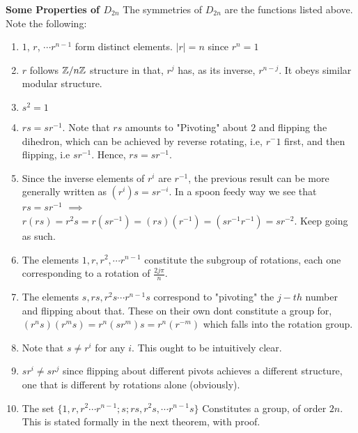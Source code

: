 \documentclass[../Main.tex]{subfiles}
\begin{document}

\textbf{Some Properties of $D_{2n}$}
The symmetries of $D_{2n}$ are the functions listed above. Note the following:
\begin{enumerate}
    \item $1$, $r$, $\cdots r^{n-1}$ form distinct elements. $|r|=n$ since $r^n=1$
    \item $r$ follows $\mathbb Z /n \mathbb Z$ structure in that, $r^{j}$ has, as its inverse, $r^{n-j}$. It obeys similar modular structure.
    \item $s^2=1$
    \item $rs=sr^{-1}$. Note that $rs$ amounts to "Pivoting" about $2$ and flipping the dihedron, which can be achieved by reverse rotating, i.e, $r^-1$ first, and then flipping, i.e $sr^{-1}$. Hence, $rs=sr^{-1}$.
    \item Since the inverse elements of $r^i$ are $r^{-1}$, the previous result can be more generally written as $(r^i)s=sr^{-i}$. In a spoon feedy way we see that $rs=sr^{-1}$ $\implies$ $r(rs)=r^2s=r(sr^{-1})=(rs)(r^{-1})=(sr^{-1}r^{-1})=sr^{-2}$. Keep going as such.
    \item The elements $1,r,r^2, \cdots r^{n-1}$ constitute the subgroup of rotations, each one corresponding to a rotation of $\frac{2j\pi}{n}$.
    \item The elements $s, rs, r^2s \cdots r^{n-1}s$ correspond to "pivoting" the $j-th$ number and flipping about that. These on their own dont constitute a group for, $(r^ns)(r^ms)=r^n(sr^m)s=r^n(r^{-m})$ which falls into the rotation group. 
    \item Note that $s \neq r^{i}$ for any $i$. This ought to be intuitively clear.
    \item $sr^{i}\neq sr^{j}$ since flipping about different pivots achieves a different structure, one that is different by rotations alone (obviously).
    \item The set $\{1,r,r^2 \cdots r^{n-1}; s; rs,r^2s, \cdots r^{n-1}s\}$ Constitutes a group, of order $2n$. This is stated formally in the next theorem, with proof.  
\end{enumerate}

\end{document}
